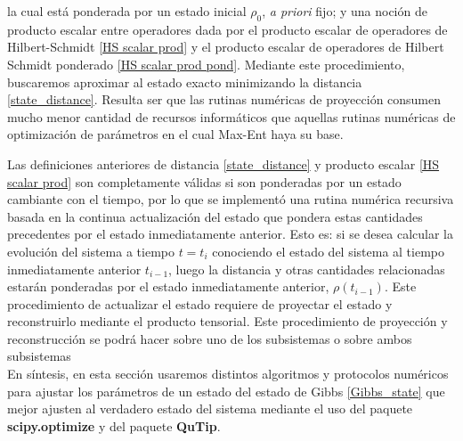 \documentclass{report} %
\numberwithin{equation}{section}
\begin{document}
la cual está ponderada por un estado inicial $\rho_0$, \textit{a priori} fijo; y una noción de producto escalar entre operadores dada por el producto escalar de operadores de Hilbert-Schmidt \eqref{HS scalar prod} y el producto escalar de operadores de Hilbert Schmidt ponderado \eqref{HS scalar prod pond}. Mediante este procedimiento, buscaremos aproximar al estado exacto minimizando la distancia \eqref{state_distance}. Resulta ser que las rutinas numéricas de proyección consumen mucho menor cantidad de recursos informáticos que aquellas rutinas numéricas de optimización de parámetros en el cual Max-Ent haya su base. 

Las definiciones anteriores de distancia \eqref{state_distance} y producto escalar \eqref{HS scalar prod} son completamente válidas si son ponderadas por un estado cambiante con el tiempo, por lo que se implementó una rutina numérica recursiva basada en la continua actualización del estado que pondera estas cantidades precedentes por el estado inmediatamente anterior. Esto es: si se desea calcular la evolución del sistema a tiempo $t=t_i$ conociendo el estado del sistema al tiempo inmediatamente anterior $t_{i-1}$, luego la distancia y otras cantidades relacionadas estarán ponderadas por el estado inmediatamente anterior, $\rho(t_{i-1})$. Este procedimiento de actualizar el estado requiere de proyectar el estado y reconstruirlo mediante el producto tensorial. Este procedimiento de proyección y reconstrucción se podrá hacer sobre uno de los subsistemas o sobre ambos subsistemas \\

En síntesis, en esta sección usaremos distintos algoritmos y protocolos numéricos para ajustar los parámetros de un estado del estado de Gibbs \eqref{Gibbs_state} que mejor ajusten al verdadero estado del sistema mediante el uso del paquete \textbf{scipy.optimize} y del paquete \textbf{\textbf{QuTip}}.
\end{document}
